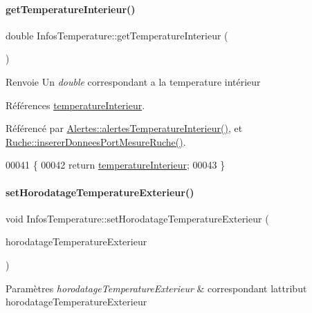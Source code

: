 \paragraph{\texorpdfstring{get\+Temperature\+Interieur()}{getTemperatureInterieur()}}
{\footnotesize\ttfamily double Infos\+Temperature\+::get\+Temperature\+Interieur (\begin{DoxyParamCaption}{ }\end{DoxyParamCaption})}

\begin{DoxyReturn}{Renvoie}
Un {\itshape double} correspondant a la temperature intérieur 
\end{DoxyReturn}


Références \hyperlink{class_infos_temperature_a976ab7ead7ac82b5b8572807d778689e}{temperature\+Interieur}.



Référencé par \hyperlink{class_alertes_a8bc56cf9eb525624b2c1f5b20f86724b}{Alertes\+::alertes\+Temperature\+Interieur()}, et \hyperlink{class_ruche_aa61f6dd8b15e5242ef3a3bdd87cca4a3}{Ruche\+::inserer\+Donnees\+Port\+Mesure\+Ruche()}.


\begin{DoxyCode}
00041 \{
00042     \textcolor{keywordflow}{return} \hyperlink{class_infos_temperature_a976ab7ead7ac82b5b8572807d778689e}{temperatureInterieur};
00043 \}
\end{DoxyCode}
\mbox{\label{class_infos_temperature_a85118414b65a715d07a92df3059c6fea}} 
\paragraph{\texorpdfstring{set\+Horodatage\+Temperature\+Exterieur()}{setHorodatageTemperatureExterieur()}}
{\footnotesize\ttfamily void Infos\+Temperature\+::set\+Horodatage\+Temperature\+Exterieur (\begin{DoxyParamCaption}\item[{const Q\+String}]{horodatage\+Temperature\+Exterieur }\end{DoxyParamCaption})}


\begin{DoxyParams}{Paramètres}
{\em horodatage\+Temperature\+Exterieur} & correspondant l\textquotesingle{}attribut horodatage\+Temperature\+Exterieur \\
\hline
\end{DoxyParams}


